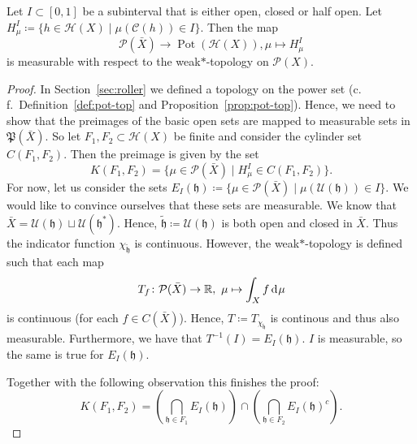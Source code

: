 \begin{lemma}[{\cites[Lem.\ A.1]{MR3509968}}]
  \label{lem:measurable-mu}
  Let \(I \subset [0,1]\) be a subinterval that is either open, closed or half open. Let \(H^I_\mu \coloneqq \{h \in \mathcal{H}(X) \mid \mu(\mathcal{C}(h)) \in I\}\). Then the map
  \[
    \mathcal{P}(\bar X) \to \operatorname{Pot}(\mathcal{H}(X)), \mu \mapsto H^I_\mu
  \]
  is measurable with respect to the weak\(\ast\)-topology on \(\mathcal{P}(X)\).
\end{lemma}

\begin{proof}
  In Section~\ref{sec:roller} we defined a topology on the power set (c.\,f.\ Definition~\ref{def:pot-top} and Proposition~\ref{prop:pot-top}). Hence, we need to show that the preimages of the basic open sets are mapped to measurable sets in \(\mathfrak{P}(\bar X)\). So let \(F_1, F_2 \subset \mathcal{H}(X)\) be finite and consider the cylinder set \(C(F_1, F_2)\). Then the preimage is given by the set
  \[
    K(F_1, F_2) = \{\mu \in \mathcal{P}(\bar X) \mid H^I_\mu \in C(F_1, F_2)\}.
  \]
  For now, let us consider the sets \(E_I(\mathfrak{h}) \coloneqq \{\mu \in \mathcal{P}(\bar X) \mid \mu(\mathcal{U}(\mathfrak{h})) \in I\}\). We would like to convince ourselves that these sets are measurable. We know that \(\bar X = \mathcal{U}(\mathfrak{h}) \sqcup \mathcal{U}(\mathfrak{h}^\ast)\). Hence, \(\mathfrak{\tilde h} \coloneqq \mathcal{U}(\mathfrak{h})\) is both open and closed in \(\bar X\). Thus the indicator function \(\chi_{\mathfrak{\tilde h}}\) is continuous. However, the weak\(\ast\)-topology is defined such that each map
  \[
    T_f\colon \mathcal{P}(\bar X) \to \R,\ \mu \mapsto \int_X f \d\mu
  \]
  is continuous (for each \(f \in C(\bar X)\)). Hence, \(T \coloneqq T_{\chi_{\mathfrak{\tilde h}}}\) is continous and thus also measurable. Furthermore, we have that \(T^{-1}(I) = E_I(\mathfrak{h})\). \(I\) is measurable, so the same is true for \(E_I(\mathfrak{h})\).

  Together with the following observation this finishes the proof:
  \[
    K(F_1, F_2) = \left (\bigcap_{\mathfrak{h} \in F_1} E_I(\mathfrak{h}) \right ) \cap \left ( \bigcap_{\mathfrak{h} \in F_2} E_I(\mathfrak{h})^{c}\right).
  \]
\end{proof}

